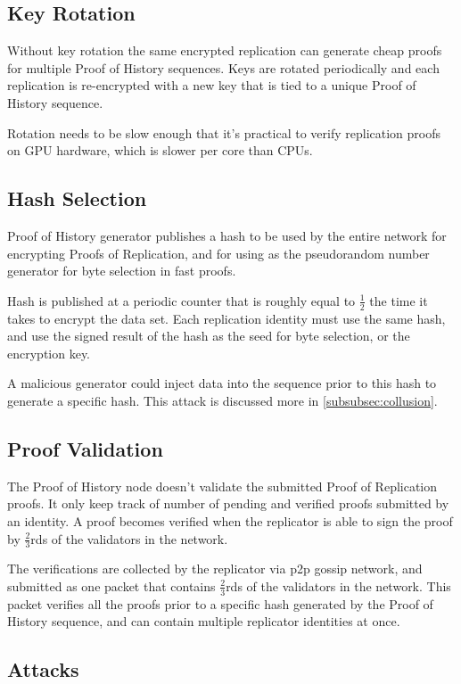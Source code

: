 \documentclass[12pt]{article}
\begin{document}
\subsection{Key Rotation}

Without key rotation the same encrypted replication can generate cheap proofs for multiple Proof of History sequences. Keys are rotated periodically and each replication is re-encrypted with a new key that is tied to a unique Proof of History sequence.

Rotation needs to be slow enough that it’s practical to verify replication proofs on GPU hardware, which is slower per core than CPUs.

\subsection{Hash Selection}\label{hashselection}

Proof of History generator publishes a hash to be used by the entire network for encrypting Proofs of Replication, and for using as the pseudorandom number generator for byte selection in fast proofs.

Hash is published at a periodic counter that is roughly equal to \(\frac{1}{2}\) the time it takes to encrypt the data set. Each replication identity must use the same hash, and use the signed result of the hash as the seed for byte selection, or the encryption key.

A malicious generator could inject data into the sequence prior to this hash to generate a specific hash. This attack is discussed more in \ref{subsubsec:collusion}.

\subsection{Proof Validation}
The Proof of History node doesn’t validate the submitted Proof of Replication proofs. It only keep track of number of pending and verified proofs submitted by an identity. A proof becomes verified when the replicator is able to sign the proof by \(\frac{2}{3}\)rds of the validators in the network. 

The verifications are collected by the replicator via p2p gossip network, and submitted as one packet that contains \(\frac{2}{3}\)rds of the validators in the network. This packet verifies all the proofs prior to a specific hash generated by the Proof of History sequence, and can contain multiple replicator identities at once.
\subsection{Attacks}
\end{document}
